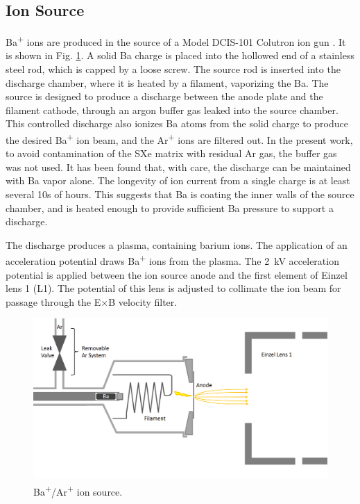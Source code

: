 \subsection{Ion Source}

Ba\textsuperscript{+} ions are produced in the source of a Model DCIS-101 Colutron ion gun \cite{Colutron}.  It is shown in Fig. \ref{fig:ionsource}.  A solid Ba charge is placed into the hollowed end of a stainless steel rod, which is capped by a loose screw.  The source rod is inserted into the discharge chamber, where it is heated by a filament, vaporizing the Ba.  The source is designed to produce a discharge between the anode plate and the filament cathode, through an argon buffer gas leaked into the source chamber.  This controlled discharge also ionizes Ba atoms from the solid charge to produce the desired Ba\textsuperscript{+} ion beam, and the Ar\textsuperscript{+} ions are filtered out.  In the present work, to avoid contamination of the SXe matrix with residual Ar gas, the buffer gas was not used.  It has been found that, with care, the discharge can be maintained with Ba vapor alone.  The longevity of ion current from a single charge is at least several 10s of hours.  This suggests that Ba is coating the inner walls of the source chamber, and is heated enough to provide sufficient Ba pressure to support a discharge.

The discharge produces a plasma, containing barium ions.  The application of an acceleration potential draws Ba\textsuperscript{+} ions from the plasma.  The 2~kV acceleration potential is applied between the ion source anode and the first element of Einzel lens 1 (L1).  The potential of this lens is adjusted to collimate the ion beam for passage through the E$\times$B velocity filter.


\begin{figure} %
        \centering
                \includegraphics[width=.95\textwidth]{figures/ionSource.png}
                \caption{Ba\textsuperscript{+}/Ar\textsuperscript{+} ion source.}
\label{fig:ionsource}
\end{figure}

